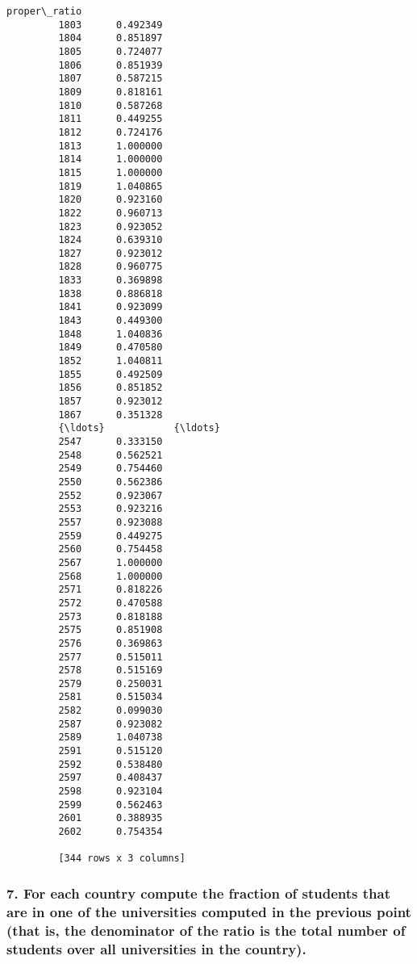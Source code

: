 \documentclass[11pt]{article}
\begin{document}
\begin{Verbatim}[commandchars=\\\{\}]
               proper\_ratio  
         1803      0.492349  
         1804      0.851897  
         1805      0.724077  
         1806      0.851939  
         1807      0.587215  
         1809      0.818161  
         1810      0.587268  
         1811      0.449255  
         1812      0.724176  
         1813      1.000000  
         1814      1.000000  
         1815      1.000000  
         1819      1.040865  
         1820      0.923160  
         1822      0.960713  
         1823      0.923052  
         1824      0.639310  
         1827      0.923012  
         1828      0.960775  
         1833      0.369898  
         1838      0.886818  
         1841      0.923099  
         1843      0.449300  
         1848      1.040836  
         1849      0.470580  
         1852      1.040811  
         1855      0.492509  
         1856      0.851852  
         1857      0.923012  
         1867      0.351328  
         {\ldots}            {\ldots}  
         2547      0.333150  
         2548      0.562521  
         2549      0.754460  
         2550      0.562386  
         2552      0.923067  
         2553      0.923216  
         2557      0.923088  
         2559      0.449275  
         2560      0.754458  
         2567      1.000000  
         2568      1.000000  
         2571      0.818226  
         2572      0.470588  
         2573      0.818188  
         2575      0.851908  
         2576      0.369863  
         2577      0.515011  
         2578      0.515169  
         2579      0.250031  
         2581      0.515034  
         2582      0.099030  
         2587      0.923082  
         2589      1.040738  
         2591      0.515120  
         2592      0.538480  
         2597      0.408437  
         2598      0.923104  
         2599      0.562463  
         2601      0.388935  
         2602      0.754354  
         
         [344 rows x 3 columns]
\end{Verbatim}
            
    \hypertarget{for-each-country-compute-the-fraction-of-students-that-are-in-one-of-the-universities-computed-in-the-previous-point-that-is-the-denominator-of-the-ratio-is-the-total-number-of-students-over-all-universities-in-the-country.}{%
\subsubsection{7. For each country compute the fraction of students that
are in one of the universities computed in the previous point (that is,
the denominator of the ratio is the total number of students over all
universities in the
country).}\label{for-each-country-compute-the-fraction-of-students-that-are-in-one-of-the-universities-computed-in-the-previous-point-that-is-the-denominator-of-the-ratio-is-the-total-number-of-students-over-all-universities-in-the-country.}}
\end{document}

